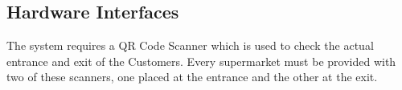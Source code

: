\subsection{Hardware Interfaces}
The system requires a QR Code Scanner which is used to check the actual entrance and exit of the Customers. Every supermarket must be provided with two of these scanners, one placed at the entrance and the other at the exit. 

 
 
